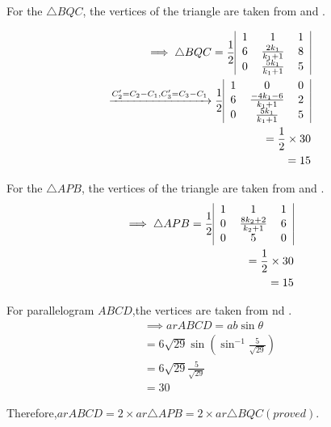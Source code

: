 \documentclass[12pt]{article}
\providecommand{\brak}[1]{\ensuremath{\left(#1\right)}}
\begin{document}
For the $\triangle BQC$, the vertices of the triangle are taken from  and .

\begin{align}
\implies\triangle BQC=
\frac{1}{2}\begin{tabular}{|c c c|}
       1 &1&1\\
       6&$\frac{2k_1}{k_1+1}$&8 \\
       0&$\frac{5k_1}{k_1+1}$&5
   \end{tabular}\\
   \xrightarrow{C_2'=C_2-C_1,C_3'=C_3-C_1}\frac{1}{2} \begin{tabular}{|c c c|}
       1 &0&0\\
       6&$\frac{-4k_1-6}{k_1+1}$&2 \\
       0&$\frac{5k_1}{k_1+1}$&5
   \end{tabular}\\
 =\frac{1}{2} \times30\\
 =15 \end{align}


For the $\triangle APB$, the vertices of the triangle are taken from  and .
   \begin{align}
	   \implies \triangle APB =\frac{1}{2}
   \begin{tabular}{|c c c|}
       1 &1&1\\
       0&$\frac{8k_2+2}{k_2+1}$&6 \\
       0&5&0
   \end{tabular}\\
 =\frac{1}{2} \times30\\
 =15 \end{align}


 
  For parallelogram $ABCD$,the vertices are taken from  nd .
\begin{align}   
\implies ar ABCD = ab\sin\theta\\
 =6\sqrt{29}\sin\brak{\sin^{-1}{\frac{5}{\sqrt{29}}}}\\
=6\sqrt{29}\frac{5}{\sqrt{29}}\\
=30\end{align}


 Therefore,$ar ABCD = 2\times ar\triangle APB = 2\times ar \triangle BQC$\brak{proved}.\\
 
\end{document}
